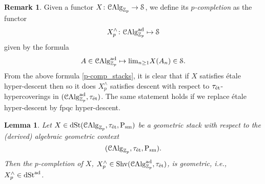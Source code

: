 \documentclass[10pt,a4paper]{amsart}
\numberwithin{equation}{subsection}
\newtheorem{lemma}[theorem]{Lemma}
\theoremstyle{definition}
\newtheorem{remark}[theorem]{Remark}
\def\lim{\mathrm{lim}}
\begin{document}
\begin{remark}
    Given a functor $X \colon \mathcal{C}\mathrm{Alg}_{\mathbb Z_p} \to \mathcal S$, we define its \emph{$p$-completion} as the functor
        \[
                X^\wedge_p \colon \mathcal C \mathrm{Alg}^{\mathrm{ad}}_{\mathbb Z_p} \mapsto \mathcal S  
        \]
    given by the formula
        \begin{equation} \label{p-comp_stacks}
                A \in \adCAlg \mapsto \lim_{n \geq 1} X(A_n) \in \cS.  
        \end{equation}
    From the above formula \eqref{p-comp_stacks}, it is clear that if $X$ satisfies \'etale hyper-descent then so it does $X^\wedge_p$ satisfies descent with respect to $\tau_{\text{\'et}}$-hypercoverings in $(\mathcal C \mathrm{Alg}^{\mathrm{ad}}_{\mathbb Z_p}, \tau_{\text{\'et}})$.
    The same statement holds if we replace \'etale hyper-descent by fpqc hyper-descent.
\end{remark}

\begin{lemma} \label{const_of_adic_geom_stacks}
    Let $X \in \mathrm{dSt}( \mathcal{C}\mathrm{Alg}_{\mathbb Z_p}, \tau_{\text{\'et}}, \mathrm P_{\mathrm{sm}})$ be a geometric stack with respect to the (derived) algebraic geometric context
        \[
            (\mathcal{C}\mathrm{Alg}_{\mathbb Z_p}, \tau_{\text{\'et}}, \mathrm P_{\mathrm{sm}}).  
        \] 
    Then the $p$-completion of $X$, $X^\wedge_p \in \mathrm{Shv}(\mathcal C \mathrm{Alg}^{\mathrm{ad}}_{\mathbb Z_p}, \tau_{\text{\'et}})$,
    is geometric, i.e., $X^\wedge_p \in \mathrm{dSt}^{\mathrm{ad}}$.
\end{lemma}
\end{document}
